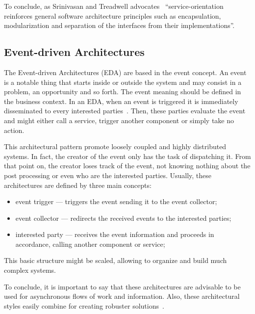 To conclude, as Srinivasan and Treadwell advocates~\citep{Srinivasan2005} ``service-orientation reinforces general software architecture principles such as encapsulation, modularization and separation of the interfaces from their implementations''.




\subsection{Event-driven Architectures}

The Event-driven Architectures (EDA) are based in the event concept. An event~\citep{Michelson2006} is a notable thing that starts inside or outside the system and may consist in a problem, an opportunity and so forth. The event meaning should be defined in the business context. In an EDA, when an event is triggered it is immediately disseminated to every interested parties~\citep{Qin2008}. Then, these parties evaluate the event and might either call a service, trigger another component or simply take no action.

This architectural pattern promote loosely coupled and highly distributed systems. In fact, the creator of the event only has the task of dispatching it. From that point on, the creator loses track of the event, not knowing nothing about the post processing or even who are the interested parties. Usually, these architectures are defined by three main concepts:
\begin{itemize}
\item event trigger --- triggers the event sending it to the event collector;
\item event collector --- redirects the received events to the interested parties;
\item interested party --- receives the event information and proceeds in accordance, calling another component or service;
\end{itemize}

This basic structure might be scaled, allowing to organize and build much complex systems.

To conclude, it is important to say that these architectures are advisable to be used for asynchronous flows of work and information. Also, these architectural styles easily combine for creating robuster solutions~\citep{Marechaux2006,Laliwala2008}.

